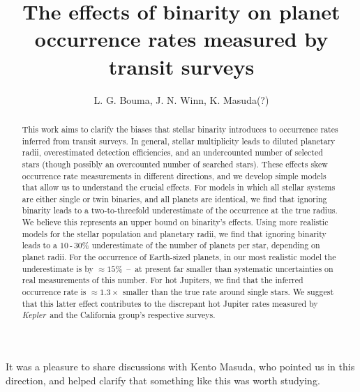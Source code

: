 \documentclass[12pt,modern]{aastex61}
\begin{document}
    
\title{ The effects of binarity on planet occurrence rates measured by transit 
surveys}

\author{
L. G. Bouma, J. N. Winn, K. Masuda(?)
}

\begin{abstract}

This work aims to clarify the biases that stellar binarity introduces
to occurrence rates inferred from transit surveys.
In general, stellar multiplicity leads to diluted planetary 
radii, overestimated detection efficiencies, and an undercounted number of 
selected stars (though possibly an overcounted number of searched stars).
These effects skew occurrence rate measurements in different directions, and 
we develop simple models that allow us to understand the crucial effects.
For models in which all stellar systems are either single or twin binaries, 
and all planets are identical, we find that ignoring binarity leads to a
two-to-threefold underestimate of the occurrence at the true radius.
We believe this represents an upper bound on binarity's effects.
Using more realistic models for the stellar population and planetary 
radii, we find that ignoring binarity leads to a $10$\,-\,$30\%$ 
underestimate of the number of planets per star, depending on planet radii.
For the occurrence of Earth-sized planets, in our most realistic model the 
underestimate is by $\approx 15\%$~--~at present far smaller than 
systematic uncertainties on real measurements of this number.
For hot Jupiters, we find that the inferred occurrence rate is 
$\approx 1.3\times$ smaller than the true rate around single stars.
We suggest that this latter effect contributes to the discrepant hot Jupiter 
rates measured by {\it Kepler}\ and the California group's respective surveys.
\end{abstract}







\acknowledgements
It was a pleasure to share discussions with Kento Masuda, who pointed us in 
this direction, and helped clarify that something like this was worth studying.



\end{document}
